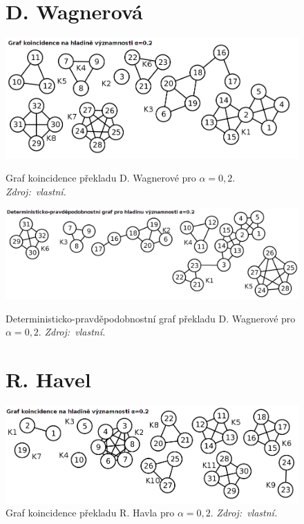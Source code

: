 \documentclass[dp.tex]{subfiles}
\begin{document}
\begin{figure}[t]
\section*{D. Wagnerová}
	{
		\centering
		\includegraphics[max width=\textwidth,keepaspectratio=true]{imgs-99-priloha-d/i_k_20}
		\caption[Graf koincidence překladu D. Wagnerové pro $\alpha = 0{,}2$]
	            {Graf koincidence překladu D. Wagnerové pro $\alpha = 0{,}2$. \textit{Zdroj:~vlastní.}}
		\label{fig:i_k_20}
	
		\vspace*{0.5cm}
	
		\includegraphics[max width=\textwidth,keepaspectratio=true]{imgs-99-priloha-d/i_d_20}
		\caption[Deterministicko-pravděpodobnostní graf překladu D. Wagnerové pro $\alpha = 0{,}2$]
	            {Deterministicko-pravděpodobnostní graf překladu D. Wagnerové pro $\alpha = 0{,}2$. \textit{Zdroj:~vlastní.}}
		\label{fig:i_d_20}
	
	}

	\vspace*{1cm}

\section*{R. Havel}
	\centering
	\includegraphics[max width=\textwidth,keepaspectratio=true]{imgs-99-priloha-d/s_k_20}
	\caption[Graf koincidence překladu R. Havla pro $\alpha = 0{,}2$]
            {Graf koincidence překladu R. Havla pro $\alpha = 0{,}2$. \textit{Zdroj:~vlastní.}}
	\label{fig:s_k_20}
\end{figure}
\end{document}
